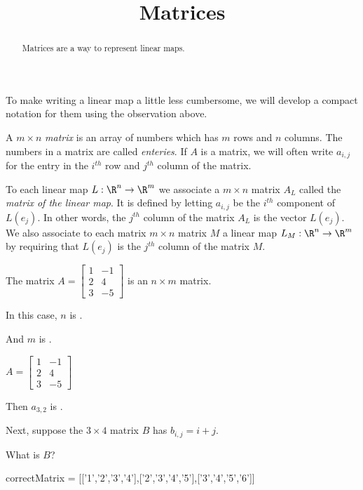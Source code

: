 \documentclass{ximera}
\title{Matrices}
\begin{document}
\begin{abstract}
  Matrices are a way to represent linear maps.
\end{abstract}

To make writing a linear map a little less cumbersome, we will develop a compact notation for them using the observation above. 
	
\begin{definition}
  A $m \times n$ \textit{matrix} is an array of numbers which has $m$ rows and $n$ columns.  The numbers in a matrix are called \textit{enteries}. If $A$ is a matrix, 
  we will often write $a_{i,j}$ for the entry in the $i^{th}$  row and $j^{th}$ column of the matrix.
\end{definition}

\begin{definition}
  To each linear map $L: \R^n \to \R^m$  we associate a $m \times n$ matrix $A_L$ called the \textit{matrix of the linear map}.  It is defined 
  by letting $a_{i,j}$ be the $i^{th}$ component of $L(e_j)$.  In other words, the $j^{th}$ column of the matrix $A_L$ is the vector $L(e_j)$.  We also associate to each 
  matrix $m \times n$ matrix $M$ a linear map $L_M: \R^n \to \R^m$ by requiring that $L(e_j)$ is the $j^{th}$ column of the matrix $M$. 
\end{definition}

\begin{question}
  The matrix $A = \begin{bmatrix}
    1&-1\\2&4\\3&-5
  \end{bmatrix}$
  is an $n \times m$ matrix.  

  \begin{solution}
    In this case, $n$ is .

    And $m$ is .
  \end{solution}
\end{question}

\begin{question}
  $A = \begin{bmatrix}
    1&-1\\2&4\\3&-5
  \end{bmatrix}$

  \begin{solution}
    Then $a_{3,2}$ is .
  \end{solution}

  Next, suppose the $3 \times 4$ matrix $B$ has $b_{i,j} = i+j$.

  \begin{solution}
    What is $B$?

    \begin{matrix-answer}[name=B]
      correctMatrix = [['1','2','3','4'],['2','3','4','5'],['3','4','5','6']]
    \end{matrix-answer}
  \end{solution}
\end{question}
\end{document}
